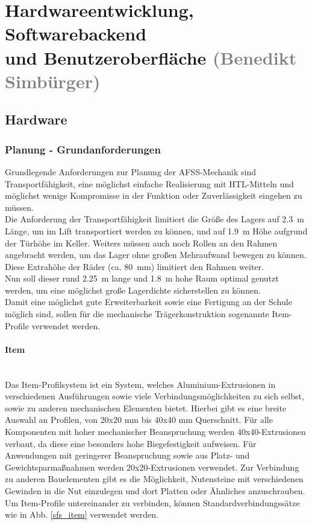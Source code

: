 \section{Hardwareentwicklung, Softwarebackend \\ und Benutzeroberfläche \textcolor{gray}{(Benedikt Simbürger)}}

\subsection{Hardware}

\subsubsection{Planung - Grundanforderungen} 
Grundlegende Anforderungen zur Planung der AFSS-Mechanik sind Transportfähigkeit, eine möglichst einfache Realisierung mit HTL-Mitteln und möglichst wenige Kompromisse in der Funktion oder Zuverlässigkeit eingehen zu müssen.\\
Die Anforderung der Transportfähigkeit limitiert die Größe des Lagers auf \SI{2.3}{\meter} Länge, um im Lift transportiert werden zu können, und auf \SI{1.9}{\meter} Höhe aufgrund der Türhöhe im Keller. Weiters müssen auch noch Rollen an den Rahmen angebracht werden, um das Lager ohne großen Mehraufwand bewegen zu können. Diese Extrahöhe der Räder (ca. \SI{80}{\mm}) limitiert den Rahmen weiter.\\
Nun soll dieser rund \SI{2.25}{\meter} lange und \SI{1.8}{\meter} hohe Raum optimal genutzt werden, um eine möglichst große Lagerdichte sicherstellen zu können.\\
Damit eine möglichst gute Erweiterbarkeit sowie eine Fertigung an der Schule möglich sind, sollen für die mechanische Trägerkonstruktion sogenannte Item-Profile verwendet werden.



\paragraph{Item}\mbox{}\\
Das Item-Profilsystem ist ein System, welches Aluminium-Extrusionen in verschiedenen Ausführungen sowie viele Verbindungsmöglichkeiten zu sich selbst, sowie zu anderen mechanischen Elementen bietet. Hierbei gibt es eine breite Auswahl an Profilen, von 20x20 mm bis 40x40 mm Querschnitt. Für alle Komponenten mit hoher mechanischer Beanspruchung werden 40x40-Extrusionen verbaut, da diese eine besonders hohe Biegefestigkeit aufweisen. Für Anwendungen mit geringerer Beanspruchung sowie aus Platz- und Gewichtsparmaßnahmen werden 20x20-Extrusionen verwendet.
Zur Verbindung zu anderen Bauelementen gibt es die Möglichkeit, Nutensteine mit verschiedenen Gewinden in die Nut einzulegen und dort Platten oder Ähnliches anzuschrauben. Um Item-Profile untereinander zu verbinden, können Standardverbindungssätze wie in Abb. \ref{sfs_item} verwendet werden.\\

